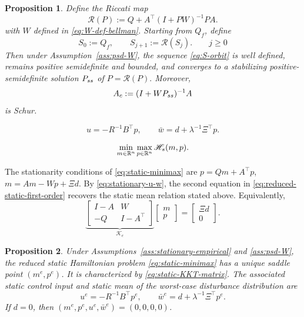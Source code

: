 \documentclass[10pt,a4paper]{amsart}
\newtheorem{proposition}{Proposition}
\begin{document}
\begin{proposition}
	\label{prop:riccati-convergence}
	Define the Riccati map
\begin{equation}
	\mathcal R(P):=Q+A^\top(I+PW)^{-1}PA .
	\label{eq:W-R-map}
\end{equation}
with $W$ defined in \eqref{eq:W-def-bellman}. Starting from \(Q_f\), define
\begin{equation}
	S_0:=Q_f,\qquad
	S_{j+1}:=\mathcal R(S_j).\qquad j\ge0
	\label{eq:S-orbit}
\end{equation}
Then under Assumption~\ref{ass:psd-W}, the sequence \eqref{eq:S-orbit} is well defined, remains positive semidefinite and bounded, and converges to a stabilizing positive-semidefinite solution
	\(P_{\rm ss}\) of
	\(
	P=\mathcal R(P).
	\)
	Moreover,
	\begin{equation}
		A_c:=(I+WP_{\rm ss})^{-1}A
		\label{eq:Ac-def}
	\end{equation}
	is Schur.
\end{proposition}

\begin{equation}
	u=-R^{-1}B^\top p,
	\qquad
	\bar w=d+\lambda^{-1}\Xi^\top p .
	\label{eq:stationary-u-w}
\end{equation}

\begin{equation}
	\min_{m\in\mathbb R^n}
	\max_{p\in\mathbb R^n}
	\mathscr H_{\rm s}(m,p).
	\label{eq:static-minimax}
\end{equation}

The stationarity conditions of
\eqref{eq:static-minimax} are
$p=Qm+A^\top p$, $m=Am-Wp+\Xi d$.
By \eqref{eq:stationary-u-w}, the second equation in
\eqref{eq:reduced-static-first-order} recovers the static mean relation
stated above. Equivalently,
\begin{equation}
	\underbrace{
		\begin{bmatrix}
			I-A & W\\
			-Q & I-A^\top
		\end{bmatrix}
	}_{\mathcal K_e}
	\begin{bmatrix}
		m\\p
	\end{bmatrix}
	=
	\begin{bmatrix}
		\Xi d\\0
	\end{bmatrix}.
	\label{eq:static-KKT-matrix}
\end{equation}

\begin{proposition}
	\label{prop:static-equilibrium}
	Under Assumptions~\ref{ass:stationary-empirical} and
	\ref{ass:psd-W}, the reduced static Hamiltonian problem
	\eqref{eq:static-minimax} has a unique saddle point
	\((m^e,p^e)\). It is characterized by
	\eqref{eq:static-KKT-matrix}. The associated static control input and
	static mean of the worst-case disturbance distribution are
	\begin{equation}
		u^e=-R^{-1}B^\top p^e,
		\qquad
		\bar w^e=d+\lambda^{-1}\Xi^\top p^e.
		\label{eq:ue-we}
	\end{equation}
	If \(d=0\), then
	$(m^e,p^e,u^e,\bar w^e)=(0,0,0,0)$.
\end{proposition}
\end{document}
